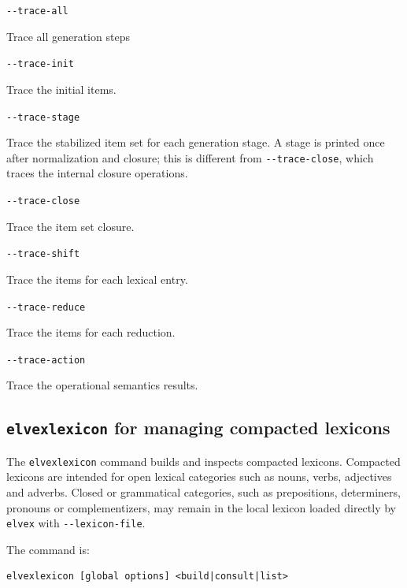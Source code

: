 \documentclass[11pt]{article}
\begin{document}
\begin{description}

	\item \verb#--trace-all#

	      Trace all generation steps

	\item \verb#--trace-init#

	      Trace the initial items.

	\item \verb#--trace-stage#

	      Trace the stabilized item set for each generation stage. A stage is
	      printed once after normalization and closure; this is different from
	      \verb#--trace-close#, which traces the internal closure operations.

	\item \verb#--trace-close#

	      Trace the item set closure.

	\item \verb#--trace-shift#

	      Trace the items for each lexical entry.

	\item \verb#--trace-reduce#

	      Trace the items for each reduction.

	\item \verb#--trace-action#

	      Trace the operational semantics results.

\end{description}


\subsection{\texttt{elvexlexicon} for managing compacted lexicons}

The \texttt{elvexlexicon} command builds and inspects compacted lexicons.
Compacted lexicons are intended for open lexical categories such as nouns,
verbs, adjectives and adverbs. Closed or grammatical categories, such as
prepositions, determiners, pronouns or complementizers, may remain in the
local lexicon loaded directly by \texttt{elvex} with \verb#--lexicon-file#.

The command is:

\begin{lstlisting}[frame=none, numbers=none]
elvexlexicon [global options] <build|consult|list>
\end{lstlisting}
\end{document}
